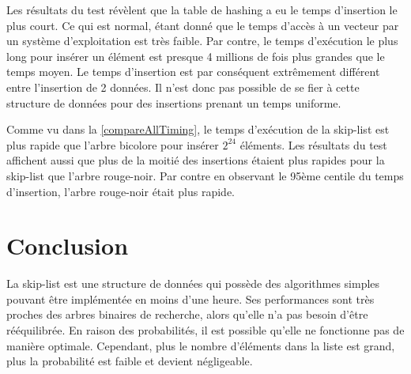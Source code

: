 \documentclass[hidelinks,a4paper, 12pt]{article}
\begin{document}
	Les résultats du test révèlent que la table de hashing a eu le temps d'insertion le plus court. Ce qui est normal, étant donné que le temps d'accès à un vecteur par un système d'exploitation est très faible. Par contre, le temps d'exécution le plus long pour insérer un élément est presque 4 millions de fois plus grandes que le temps moyen. Le temps d'insertion est par conséquent extrêmement différent entre l'insertion de 2 données. Il n'est donc pas possible de se fier à cette structure de données pour des insertions prenant un temps uniforme.
	
	Comme vu dans la \cref{compareAllTiming}, le temps d'exécution de la skip-list est plus rapide que l'arbre bicolore pour insérer $2^{24}$ éléments. Les résultats du test affichent aussi que plus de la moitié des insertions étaient plus rapides pour la skip-list que l'arbre rouge-noir. Par contre en observant le 95ème centile du temps d'insertion, l'arbre rouge-noir était plus rapide.
	
	\begin{table}[h]
		\caption{Différence entre les temps d'insertion}
		\label{deltaTiming}
	\end{table}
	
	\section{Conclusion}
	La skip-list est une structure de données qui possède des algorithmes simples pouvant être implémentée en moins d'une heure. Ses performances sont très proches des arbres binaires de recherche, alors qu'elle n'a pas besoin d'être rééquilibrée. En raison des probabilités, il est possible qu'elle ne fonctionne pas de manière optimale. Cependant, plus le nombre d'éléments dans la liste est grand, plus la probabilité est faible et devient négligeable.
	
\end{document}
